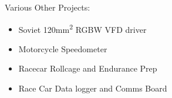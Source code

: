 \documentclass[line,mmmargin]{res}
\begin{document}
\begin{resume}
	{Various Other Projects:}
		\begin{multicols}{2}
			\begin{itemize}
				\itemsep -2pt
				\item[] Soviet 120mm\textsuperscript{2} RGBW VFD driver
				\item[] Motorcycle Speedometer
				\item[] Racecar Rollcage and Endurance Prep
				\item[] Race Car Data logger and Comms Board
			\end{itemize}
		\end{multicols}


\end{resume}
\end{document}
